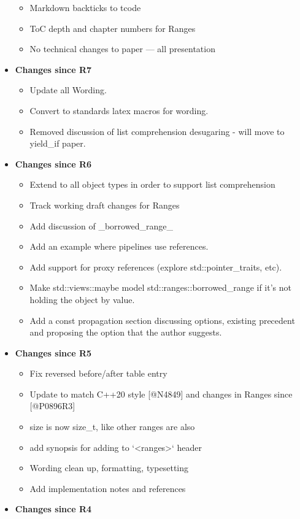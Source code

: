 \documentclass[a4paper,10pt,oneside,openany,final,article]{memoir}
\begin{document}
\begin{itemize}
\begin{itemize}
  \item Markdown backticks to tcode
  \item ToC depth and chapter numbers for Ranges
  \item No technical changes to paper --- all presentation
  \end{itemize}
\item \textbf{Changes since R7}
  \begin{itemize}
  \item Update all Wording.
  \item Convert to standards latex macros for wording.
  \item Removed discussion of list comprehension desugaring - will move to yield_if paper.
  \end{itemize}
\item \textbf{Changes since R6}
  \begin{itemize}
  \item Extend to all object types in order to support list comprehension
  \item Track working draft changes for Ranges
  \item Add discussion of _borrowed_range_
  \item Add an example where pipelines use references.
  \item Add support for proxy references (explore std::pointer_traits, etc).
  \item Make std::views::maybe model std::ranges::borrowed_range if it's not holding the object by value.
  \item Add a const propagation section discussing options, existing precedent and proposing the option that the author suggests.
  \end{itemize}
\item \textbf{Changes since R5}
  \begin{itemize}
  \item Fix reversed before/after table entry
  \item Update to match C++20 style [@N4849] and changes in Ranges since [@P0896R3]
  \item size is now size_t, like other ranges are also
  \item add synopsis for adding to `<ranges>` header
  \item Wording clean up, formatting, typesetting
  \item Add implementation notes and references
  \end{itemize}
\item \textbf{Changes since R4}

\end{itemize}
\end{document}
